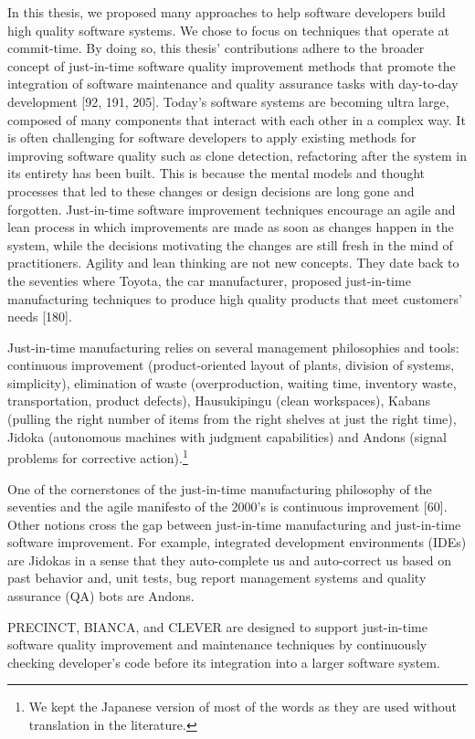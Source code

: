 \documentclass[12pt]{report}
\begin{document}
In this thesis, we proposed many approaches to help software developers
build high quality software systems. We chose to focus on techniques
that operate at commit-time. By doing so, this thesis' contributions
adhere to the broader concept of just-in-time software quality
improvement methods that promote the integration of software maintenance
and quality assurance tasks with day-to-day development {[}92, 191,
205{]}. Today's software systems are becoming ultra large, composed of
many components that interact with each other in a complex way. It is
often challenging for software developers to apply existing methods for
improving software quality such as clone detection, refactoring after
the system in its entirety has been built. This is because the mental
models and thought processes that led to these changes or design
decisions are long gone and forgotten. Just-in-time software improvement
techniques encourage an agile and lean process in which improvements are
made as soon as changes happen in the system, while the decisions
motivating the changes are still fresh in the mind of practitioners.
Agility and lean thinking are not new concepts. They date back to the
seventies where Toyota, the car manufacturer, proposed just-in-time
manufacturing techniques to produce high quality products that meet
customers' needs {[}180{]}.

Just-in-time manufacturing relies on several management philosophies and
tools: continuous improvement (product-oriented layout of plants,
division of systems, simplicity), elimination of waste (overproduction,
waiting time, inventory waste, transportation, product defects),
Hausukipingu (clean workspaces), Kabans (pulling the right number of
items from the right shelves at just the right time), Jidoka (autonomous
machines with judgment capabilities) and Andons (signal problems for
corrective action).\footnote{We kept the Japanese version of most of the
  words as they are used without translation in the literature.}

One of the cornerstones of the just-in-time manufacturing philosophy of
the seventies and the agile manifesto of the 2000's is continuous
improvement {[}60{]}. Other notions cross the gap between just-in-time
manufacturing and just-in-time software improvement. For example,
integrated development environments (IDEs) are Jidokas in a sense that
they auto-complete us and auto-correct us based on past behavior and,
unit tests, bug report management systems and quality assurance (QA)
bots are Andons.

PRECINCT, BIANCA, and CLEVER are designed to support just-in-time
software quality improvement and maintenance techniques by continuously
checking developer's code before its integration into a larger software
system.
\end{document}
